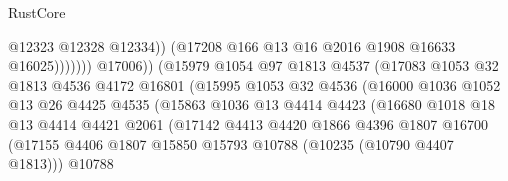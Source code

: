 \begin{lexlean}{RustCore}
\begin{coremodule}
                                                  @12323
                                                  @12328
                                                  @12334))
                                              (@17208 @166 @13 @16 @2016 @1908 @16633 @16025)))))))
                                  @17006))
                              (@15979
                                @1054
                                @97
                                @1813
                                @4537
                                (@17083
                                  @1053
                                  @32
                                  @1813
                                  @4536
                                  @4172
                                  @16801
                                  (@15995
                                    @1053
                                    @32
                                    @4536
                                    (@16000
                                      @1036
                                      @1052
                                      @13
                                      @26
                                      @4425
                                      @4535
                                      (@15863
                                        @1036
                                        @13
                                        @4414
                                        @4423
                                        (@16680
                                          @1018
                                          @18
                                          @13
                                          @4414
                                          @4421
                                          @2061
                                          (@17142
                                            @4413
                                            @4420
                                            @1866
                                            @4396
                                            @1807
                                            @16700
                                            (@17155
                                              @4406
                                              @1807
                                              @15850
                                              @15793
                                              @10788
                                              (@10235 (@10790 @4407 @1813)))
                                            @10788

\end{coremodule}
\end{lexlean}
